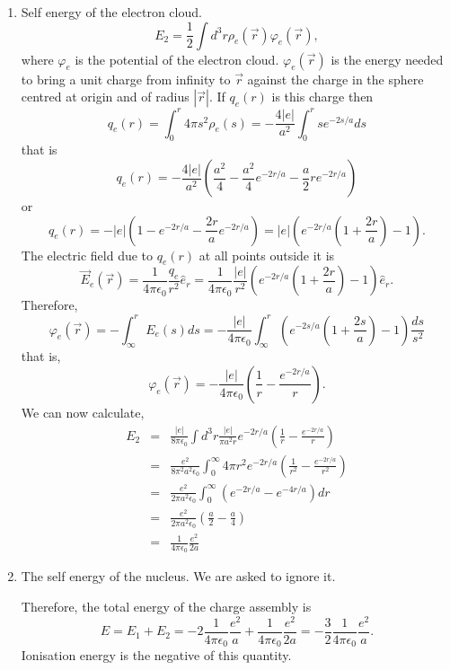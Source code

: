 \documentclass{article}
\newcommand{\uv}[1]{\hat{e}_{#1}}
\newcommand{\ke}{\frac{1}{4\pi\epsilon_0}}
\begin{document}
\begin{enumerate}
\begin{enumerate}
\item Self energy of the electron cloud.
\[
E_2 = \frac{1}{2}\int d^3r \rho_e(\vec{r})\varphi_e(\vec{r}),
\]
where $\varphi_e$ is the potential of the electron cloud. $\varphi_e(\vec{r})$ is
the energy needed to bring a unit charge from infinity to $\vec{r}$ against the
charge in the sphere centred at origin and of radius $|\vec{r}|$. If $q_e(r)$ is
this charge then
\[
q_e(r) = \int_0^r 4\pi s^2\rho_e(s) = -\frac{4|e|}{a^2} \int_0^r se^{-2s/a} ds
\]
that is
\[
q_e(r) = -\frac{4|e|}{a^2}\left(\frac{a^2}{4} - \frac{a^2}{4}e^{-2r/a} - \frac{a}{2}re^{-2r/a}\right)
\]
or
\[
q_e(r) = -|e|\left(1 - e^{-2r/a} - \frac{2r}{a}e^{-2r/a}\right) = 
|e|\left(e^{-2r/a}\left(1 + \frac{2r}{a}\right) - 1\right).
\]
The electric field due to $q_e(r)$ at all points outside it is
\[
\vec{E}_e(\vec{r}) = \ke\frac{q_e}{r^2}\uv{r} = 
\ke\frac{|e|}{r^2}\left(e^{-2r/a}\left(1 + \frac{2r}{a}\right) - 1\right)\uv{r}.
\]
Therefore,
\[
\varphi_e(\vec{r}) = -\int_\infty^r E_e(s)ds = -\frac{|e|}{4\pi\epsilon_0}
\int_\infty^r \left(e^{-2s/a}\left(1 + \frac{2s}{a}\right) - 1\right)\frac{ds}{s^2}
\]
that is,
\[
\varphi_e(\vec{r}) = -\frac{|e|}{4\pi\epsilon_0}\left(\frac{1}{r} - \frac{e^{-2r/a}}{r}\right).
\]
We can now calculate,
\begin{eqnarray*}
E_2 &=& \frac{|e|}{8\pi\epsilon_0}\int d^3r \frac{|e|}{\pi a^2r}e^{-2r/a}\left(\frac{1}{r} - \frac{e^{-2r/a}}{r}\right) \\
 &=& \frac{e^2}{8\pi^2a^2\epsilon_0}\int_0^\infty 4\pi r^2 e^{-2r/a}\left(\frac{1}{r^2} - \frac{e^{-2r/a}}{r^2}\right) \\
 &=& \frac{e^2}{2\pi a^2\epsilon_0}\int_0^\infty(e^{-2r/a} - e^{-4r/a})dr \\
 &=& \frac{e^2}{2\pi a^2\epsilon_0}\left(\frac{a}{2} - \frac{a}{4}\right) \\
 &=& \ke\frac{e^2}{2a}
\end{eqnarray*}

\item The self energy of the nucleus. We are asked to ignore it.

Therefore, the total energy of the charge assembly is
\[
E = E_1 + E_2 = -2\ke\frac{e^2}{a} + \ke\frac{e^2}{2a} = -\frac{3}{2}\ke\frac{e^2}{a}.
\]
Ionisation energy is the negative of this quantity.

\end{enumerate}
\end{enumerate}
\end{document}
